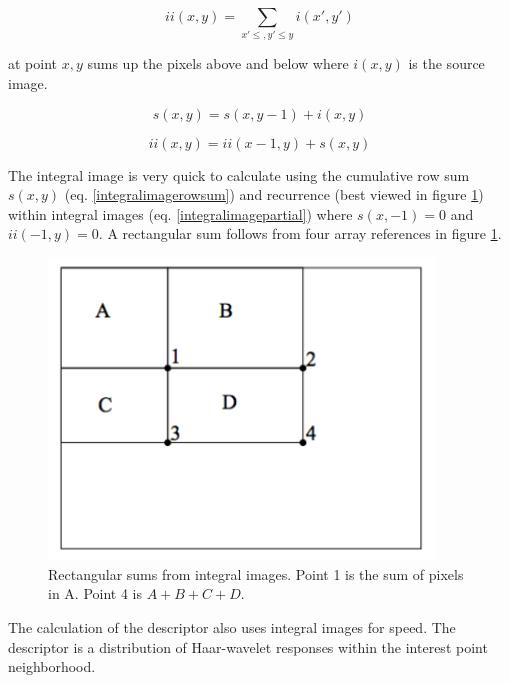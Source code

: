 \documentclass[english,12pt,a4paper,pdftex,elec,utf8]{aaltothesis}
\begin{document}
\begin{equation}
  \label{integralimage}
ii(x,y) = \sum\limits_{x'\le,y'\le y} i(x', y')
\end{equation}

at point $x, y$ sums up the pixels above and below where $i(x,y)$ is the source image. \cite{Viola2001}

\begin{equation}
  \label{integralimagerowsum}
s(x,y) = s(x, y - 1) + i(x,y)
\end{equation}

\begin{equation}
  \label{integralimagepartial}
  ii(x,y) = ii(x-1,y) + s(x,y)
\end{equation}

The integral image is very quick to calculate using the cumulative row sum $s(x,y)$ (eq. \ref{integralimagerowsum}) and recurrence (best viewed in figure \ref{integralimagefig}) within integral images (eq. \ref{integralimagepartial}) where $s(x, -1) = 0$ and $ii(-1,y)=0$. A rectangular sum follows from four array references in figure \ref{integralimagefig}.

\begin{figure}[htb]
\begin{center}
\includegraphics[height=8cm]{figures/integralimage}
\end{center}
\caption{Rectangular sums from integral images. Point 1 is the sum of pixels in A. Point 4 is $A + B + C + D$.\cite{Viola2001}}
\label{integralimagefig}
\end{figure}

The calculation of the descriptor also uses integral images for speed. The descriptor is a distribution of Haar-wavelet responses within the interest point neighborhood. \cite{Bay2006}
\end{document}
